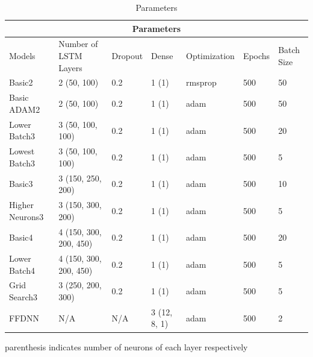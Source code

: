 ﻿\documentclass[10pt,11pt,12pt,oneside]{book}
\begin{document}
\begin{table}[H]
\centering
\begin{threeparttable}
\begin{tabular}{ |p{2cm}||p{2.5cm}|p{1.5cm}|p{1.5cm}| p{2.5cm} | p{1.5cm}| p{1.5cm} |   }
 \hline
 \multicolumn{7}{|c|}{Parameters} \\
 \hline
Models & Number of LSTM Layers & Dropout & Dense & Optimization & Epochs & Batch Size\\
 \hline
 Basic2 & 2 (50, 100) & 0.2 & 1 (1) & rmsprop & 500 & 50\\
 \hline
 Basic ADAM2 & 2 (50, 100) & 0.2 & 1 (1) & adam & 500 & 50\\
 \hline
 Lower Batch3 & 3 (50, 100, 100) & 0.2 & 1 (1) & adam & 500 & 20\\
 \hline
 Lowest Batch3 & 3 (50, 100, 100) & 0.2 & 1 (1) & adam & 500 & 5\\
 \hline
 Basic3 & 3 (150, 250, 200) & 0.2 & 1 (1) & adam & 500 & 10\\
 \hline
Higher Neurons3 & 3 (150, 300, 200) & 0.2 & 1 (1) & adam & 500 & 5\\
 \hline
 Basic4 & 4 (150, 300, 200, 450) & 0.2 & 1 (1) & adam & 500 & 20\\
 \hline
 Lower Batch4 & 4 (150, 300, 200, 450) & 0.2 & 1 (1) & adam & 500 & 5\\
 \hline
 Grid Search3 & 3 (250, 200, 300) & 0.2 & 1 (1) & adam & 500 & 5\\
  \hline
 FFDNN & N/A & N/A & 3 (12, 8, 1) & adam & 500 & 2\\
 \hline
\end{tabular}
\begin{tablenotes}
      \small
      \item parenthesis indicates number of neurons of each layer respectively
    \end{tablenotes}
\end{threeparttable}
\caption{Parameters}
\label{table:params}
\end{table}
\end{document}
